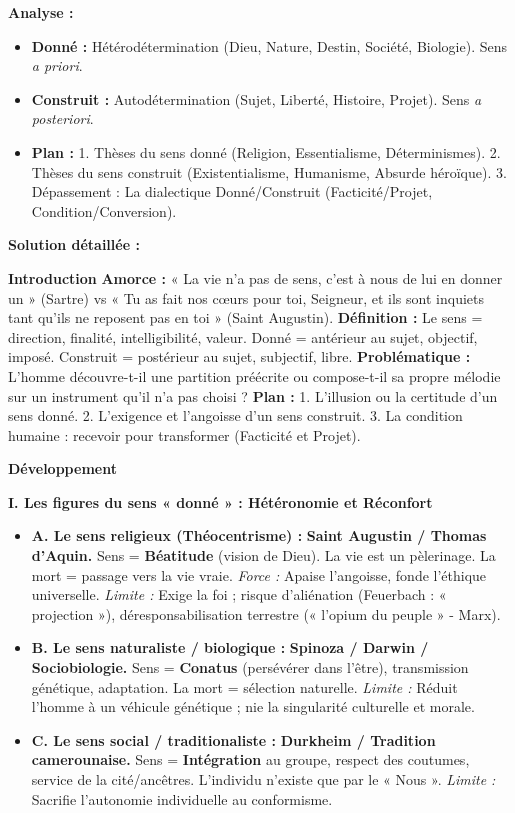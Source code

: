\documentclass[11pt]{article}
\newcommand{\cle}[1]{{\popxbold\color{popdark}#1}}
\begin{document}
\begin{exoresolu}
\textbf{Analyse :}
\begin{itemize}
    \item \textbf{Donné :} Hétérodétermination (Dieu, Nature, Destin, Société, Biologie). Sens \emph{a priori}.
    \item \textbf{Construit :} Autodétermination (Sujet, Liberté, Histoire, Projet). Sens \emph{a posteriori}.
    \item \textbf{Plan :} 1. Thèses du sens donné (Religion, Essentialisme, Déterminismes). 2. Thèses du sens construit (Existentialisme, Humanisme, Absurde héroïque). 3. Dépassement : La dialectique Donné/Construit (Facticité/Projet, Condition/Conversion).
\end{itemize}

\tcblower

\textbf{Solution détaillée :}

\textbf{Introduction}
\textbf{Amorce :} « La vie n'a pas de sens, c'est à nous de lui en donner un » (Sartre) vs « Tu as fait nos cœurs pour toi, Seigneur, et ils sont inquiets tant qu'ils ne reposent pas en toi » (Saint Augustin).
\textbf{Définition :} Le \cle{sens} = direction, finalité, intelligibilité, valeur. \cle{Donné} = antérieur au sujet, objectif, imposé. \cle{Construit} = postérieur au sujet, subjectif, libre.
\textbf{Problématique :} L'homme découvre-t-il une partition préécrite ou compose-t-il sa propre mélodie sur un instrument qu'il n'a pas choisi ?
\textbf{Plan :} 1. L'illusion ou la certitude d'un sens donné. 2. L'exigence et l'angoisse d'un sens construit. 3. La condition humaine : recevoir pour transformer (Facticité et Projet).

\textbf{Développement}

\textbf{I. Les figures du sens « donné » : Hétéronomie et Réconfort}
\begin{itemize}
    \item \textbf{A. Le sens religieux (Théocentrisme) :} \textbf{Saint Augustin / Thomas d'Aquin.} Sens = \textbf{Béatitude} (vision de Dieu). La vie est un pèlerinage. La mort = passage vers la vie vraie. \textit{Force :} Apaise l'angoisse, fonde l'éthique universelle. \textit{Limite :} Exige la foi ; risque d'aliénation (Feuerbach : « projection »), déresponsabilisation terrestre (« l'opium du peuple » - Marx).
    \item \textbf{B. Le sens naturaliste / biologique :} \textbf{Spinoza / Darwin / Sociobiologie.} Sens = \textbf{Conatus} (persévérer dans l'être), transmission génétique, adaptation. La mort = sélection naturelle. \textit{Limite :} Réduit l'homme à un véhicule génétique ; nie la singularité culturelle et morale.
    \item \textbf{C. Le sens social / traditionaliste :} \textbf{Durkheim / Tradition camerounaise.} Sens = \textbf{Intégration} au groupe, respect des coutumes, service de la cité/ancêtres. L'individu n'existe que par le « Nous ». \textit{Limite :} Sacrifie l'autonomie individuelle au conformisme.
\end{itemize}


\end{exoresolu}
\end{document}

